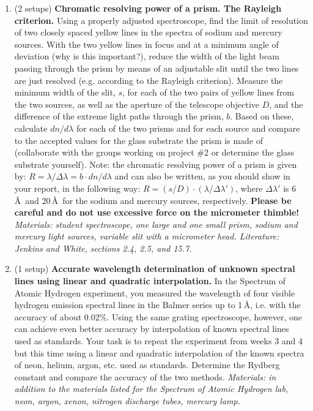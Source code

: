 \documentclass[12pt]{article}
\begin{document}
\begin{enumerate}
    \item (2 setups) \textbf{Chromatic resolving power of a prism. The Rayleigh criterion.} Using a properly adjusted spectroscope, find the limit of resolution of two closely spaced yellow lines in the spectra of sodium and mercury sources. With the two yellow lines in focus and at a minimum angle of deviation (why is this important?), reduce the width of the light beam passing through the prism by means of an adjustable slit until the two lines are just resolved (e.g. according to the Rayleigh criterion). Measure the minimum width of the slit, $s$, for each of the two pairs of yellow lines from the two sources, as well as the aperture of the telescope objective $D$, and the difference of the extreme light paths through the prism, $b$. Based on these, calculate $dn/d\lambda$ for each of the two prisms and for each source and compare to the accepted values for the glass substrate the prism is made of (collaborate with the groups working on project \#2 or determine the glass substrate yourself). Note: the chromatic resolving power of a prism is given by: $R = \lambda/\Delta \lambda = b \cdot dn/d\lambda$ and can also be written, as you should show in your report, in the following way: $R = (s/D)\cdot (\lambda/\Delta \lambda')$, where $\Delta \lambda'$ is 6\,\AA~and 20\,\AA~for the sodium and mercury sources, respectively. \textbf{Please be careful and do not use excessive force on the micrometer thimble!} \textit{Materials: student spectroscope, one large and one small prism, sodium and mercury light sources, variable slit with a micrometer head. Literature: Jenkins and White, sections 2.4, 2.5, and 15.7.}
    \item (1 setup) \textbf{Accurate wavelength determination of unknown spectral lines using linear and quadratic interpolation.} In the Spectrum of Atomic Hydrogen experiment, you measured the wavelength of four visible hydrogen emission spectral lines in the Balmer series up to 1\,\AA, i.e. with the accuracy of about 0.02\%. Using the same grating spectroscope, however, one can achieve even better accuracy by interpolation of known spectral lines used as standards. Your task is to repeat the experiment from weeks 3 and 4 but this time using a linear and quadratic interpolation of the known spectra of neon, helium, argon, etc. used as standards. Determine the Rydberg constant and compare the accuracy of the two methods. \textit{Materials: in addition to the materials listed for the Spectrum of Atomic Hydrogen lab, neon, argon, xenon, nitrogen discharge tubes, mercury lamp.}

\end{enumerate}
\end{document}

